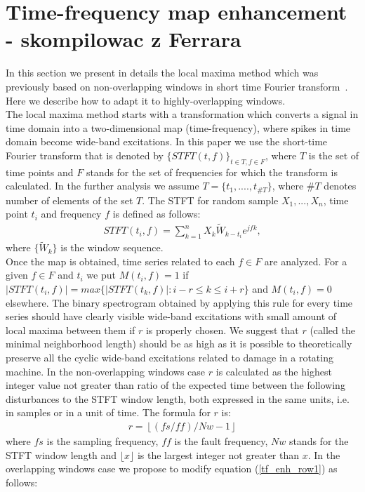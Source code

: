 \section{Time-frequency map enhancement - skompilowac z Ferrara}\label{methodology_tf_enh}

In this section we present in details  the local maxima method which was previously based on non-overlapping windows in short time Fourier transform~\cite{Obuchowski2014325}. Here we describe how to adapt it to highly-overlapping windows.\\
The local maxima method starts with a transformation which converts a signal in time domain into a two-dimensional map (time-frequency), where spikes in time domain become wide-band excitations. In this paper we use the short-time Fourier transform that is denoted by $\{STFT(t,f)\}_{t\in T, f\in F}$, where $T$ is the set of time points and $F$ stands for the set of frequencies for which the transform is calculated. In the further analysis we assume $T=\{t_1,....,t_{\#T}\}$, where $\#T$ denotes number of elements of the set $T$. The STFT for random sample $X_1, ...,X_n$, time point $t_i$ and frequency $f$ is defined as follows:
\begin{eqnarray}
STFT(t_i,f)=\sum_{k=1}^{n}X_k\tilde{W}_{k-t_i}e^{jfk},
\end{eqnarray}
where $\{\tilde{W}_k\}$ is the window sequence.\\
Once the map is obtained, time series related to each $f\in F$ are analyzed.  For a given $f\in F$  and $t_i$ we put $M(t_i,f)=1$ if $|STFT(t_i,f)|=max\{|STFT(t_k,f)|: i-r\leq k\leq i+r\}$ and $M(t_i,f)=0$ elsewhere. The binary spectrogram obtained by applying this rule for every time series should have clearly visible wide-band excitations with small amount of local maxima between them if $r$ is properly chosen. We suggest  that $r$ (called the minimal neighborhood length) should be as high as it is possible to theoretically preserve all the cyclic wide-band excitations related to damage in a rotating machine. In the non-overlapping windows case $r$ is calculated as the highest integer value not greater than ratio of the expected time between the following disturbances to the STFT window length, both expressed in the same units, i.e. in samples or in a unit of time. The formula for $r$ is:
\begin{eqnarray}r=\left\lfloor (fs/ff)/Nw-1\right\rfloor\label{tf_enh_row1}
\end{eqnarray}
where $fs$ is the sampling frequency, $ff$ is the fault frequency, $Nw$ stands for the STFT window length and $\lfloor x\rfloor$ is the largest integer not greater than $x$. In the overlapping windows case we propose to modify equation (\ref{tf_enh_row1}) as follows:
